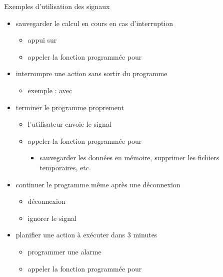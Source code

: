 \begin {frame} {Exemples d'utilisation des signaux}

    \begin {itemize}
	\item sauvegarder le calcul en cours en cas d'interruption
	    \begin {itemize}
		\item appui sur 
		    \implique {}
		\item appeler la fonction programmée pour 
	    \end {itemize}

	\item interrompre une action sans sortir du programme
	    \begin {itemize}
		\item exemple : 
		    avec 
	    \end {itemize}

	\item terminer le programme proprement
	    \begin {itemize}
		\item l'utilisateur envoie le signal 
		\item appeler la fonction programmée pour 
		    \begin {itemize}
			\item sauvegarder les données en mémoire,
			    supprimer les fichiers temporaires, etc.
		    \end {itemize}
	    \end {itemize}

	\item continuer le programme même après une déconnexion
	    \begin {itemize}
		\item déconnexion \implique {}
		\item ignorer le signal
	    \end {itemize}

	\item planifier une action à exécuter dans 3 minutes
	    \begin {itemize}
		\item programmer une alarme \implique {}
		\item appeler la fonction programmée pour 
	    \end {itemize}
    \end {itemize}
\end {frame}

